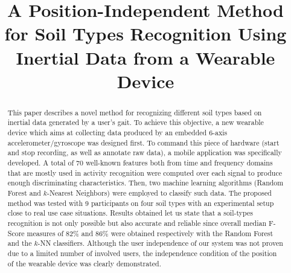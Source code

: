 \documentclass[conference]{IEEEtran}
\begin{document}
%
\title{A Position-Independent Method for Soil Types Recognition Using Inertial Data from a Wearable Device}

\author{

}

\maketitle

\begin{abstract}
This paper describes a novel method for recognizing different soil types based on inertial data generated by a user's gait. To achieve this objective, a new wearable device which aims at collecting data produced by an embedded 6-axis accelerometer/gyroscope was designed first. To command this piece of hardware (start and stop recording, as well as annotate raw data), a mobile application was specifically developed. A total of 70 well-known features both from time and frequency domains that are mostly used in activity recognition were computed over each signal to produce enough discriminating characteristics. Then, two machine learning algorithms (Random Forest and $k$-Nearest Neighbors) were employed to classify such data. The proposed method was tested with 9 participants on four soil types with an experimental setup close to real use case situations. Results obtained let us state that a soil-types recognition is not only possible but also accurate and reliable since overall median F-Score measures of 82\% and 86\% were obtained respectively with the Random Forest and the $k$-NN classifiers. Although the user independence of our system was not proven due to a limited number of involved users, the independence condition of the position of the wearable device was clearly demonstrated.
\end{abstract}
\end{document}
